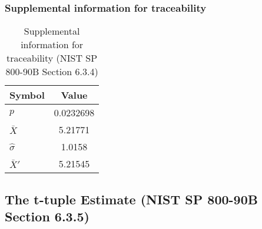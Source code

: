 \documentclass[a3paper,xelatex,english]{bxjsarticle}
\begin{document}
\subsubsection{Supplemental information for traceability}
\renewcommand{\arraystretch}{1.8}
\begin{table}[h]
\caption{Supplemental information for traceability (NIST SP 800-90B Section 6.3.4)}
\begin{center}
\begin{tabular}{|l|c|}
\hline 
\rowcolor{anotherlightblue} %
Symbol				& Value \\ \hline 
$p$				& 0.0232698\\ \hline 
$\bar{X}$ 		&  5.21771\\ \hline
$\hat{\sigma}$		&   1.0158\\ \hline
$\bar{X}'$ 		&  5.21545\\ \hline
\end{tabular}
\end{center}
\end{table}
\renewcommand{\arraystretch}{1.4}
\clearpage
\subsection{The t-tuple Estimate (NIST SP 800-90B Section 6.3.5)}\label{sec:Binary635}
\end{document}
